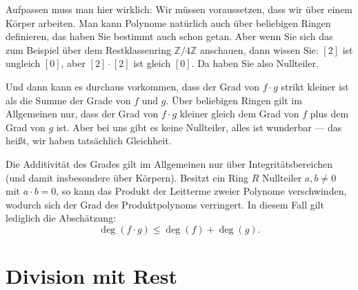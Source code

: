 \begin{spoken-clean}[00:15:00 - 00:18:00]
Aufpassen muss man hier wirklich: Wir müssen voraussetzen, dass wir über einem Körper arbeiten. Man kann Polynome natürlich auch über beliebigen Ringen definieren, das haben Sie bestimmt auch schon getan. Aber wenn Sie sich das zum Beispiel über dem Restklassenring $\mathbb{Z}/4\mathbb{Z}$ anschauen, dann wissen Sie: $[2]$ ist ungleich $[0]$, aber $[2] \cdot [2]$ ist gleich $[0]$. Da haben Sie also Nullteiler. 

Und dann kann es durchaus vorkommen, dass der Grad von $f \cdot g$ strikt kleiner ist als die Summe der Grade von $f$ und $g$. Über beliebigen Ringen gilt im Allgemeinen nur, dass der Grad von $f \cdot g$ kleiner gleich dem Grad von $f$ plus dem Grad von $g$ ist. Aber bei uns gibt es keine Nullteiler, alles ist wunderbar --- das heißt, wir haben tatsächlich Gleichheit.
\end{spoken-clean}

\begin{didactic-insight}
Die Additivität des Grades gilt im Allgemeinen nur über Integritätsbereichen (und damit insbesondere über Körpern). Besitzt ein Ring $R$ Nullteiler $a, b \neq 0$ mit $a \cdot b = 0$, so kann das Produkt der Leitterme zweier Polynome verschwinden, wodurch sich der Grad des Produktpolynoms verringert. In diesem Fall gilt lediglich die Abschätzung:
\[
\deg(f \cdot g) \le \deg(f) + \deg(g).
\]
\end{didactic-insight}

\section{Division mit Rest}

